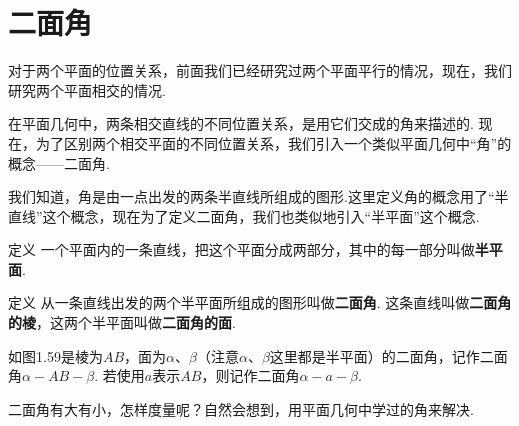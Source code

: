 \section{二面角}
对于两个平面的位置关系，前面我们已经研究过两个平面平行的情况，现在，我们研究两个平面相交的情况.

在平面几何中，两条相交直线的不同位置关系，是用它们交成的角来描述的. 现在，为了区别两个相交平面的不同位置关系，我们引入一个类似平面几何中“角”的概念——二面角.

我们知道，角是由一点出发的两条半直线所组成的图形.这里定义角的概念用了“半直线”这个概念，现在为了定义二面角，我们也类似地引入“半平面”这个概念.

\begin{thm}
  {定义} 一个平面内的一条直线，把这个平面分成两部分，其中的每一部分叫做\textbf{半平面}.  
\end{thm}

\begin{thm}
  {定义} 从一条直线出发的两个半平面所组成的图形叫做\textbf{二面角}. 这条直线叫做\textbf{二面角的棱}，这两个半平面叫做\textbf{二面角的面}.  
\end{thm}


\noindent
\begin{minipage}{.53\textwidth}
\CTEXindent
如图1.59是棱为$AB$，面为$\alpha$、$\beta$（注意$\alpha$、$\beta$这里都是半平面）的二面角，记作二面角$\alpha-AB-\beta$. 若使用$a$表示$AB$，则记作二面角$\alpha-a-\beta$.

二面角有大有小，怎样度量呢？自然会想到，用平面几何中学过的角来解决.
\end{minipage}
\hfill
\begin{minipage}{.45\textwidth}
\centering
{}
\end{minipage}



